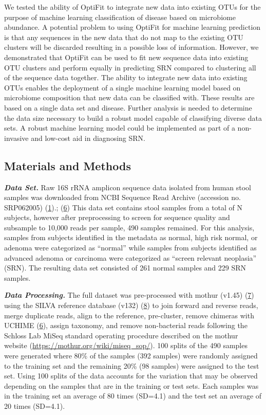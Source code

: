\documentclass[
]{article}
\begin{document}
We tested the ability of OptiFit to integrate new data into existing
OTUs for the purpose of machine learning classification of disease based
on microbiome abundance. A potential problem to using OptiFit for
machine learning prediction is that any sequences in the new data that
do not map to the existing OTU clusters will be discarded resulting in a
possible loss of information. However, we demonstrated that OptiFit can
be used to fit new sequence data into existing OTU clusters and perform
equally in predicting SRN compared to clustering all of the sequence
data together. The ability to integrate new data into existing OTUs
enables the deployment of a single machine learning model based on
microbiome composition that new data can be classified with. These
results are based on a single data set and disease. Further analysis is
needed to determine the data size necessary to build a robust model
capable of classifying diverse data sets. A robust machine learning
model could be implemented as part of a non-invasive and low-cost aid in
diagnosing SRN.

\hypertarget{materials-and-methods}{%
\subsection{Materials and Methods}\label{materials-and-methods}}

\textbf{\emph{Data Set.}} Raw 16S rRNA amplicon sequence data isolated
from human stool samples was downloaded from NCBI Sequence Read Archive
(accession no. SRP062005) (\protect\hyperlink{ref-baxter2016}{1}).;
(\protect\hyperlink{ref-edgar2011}{6}) This data set contains stool
samples from a total of N subjects, however after preprocessing to
screen for sequence quality and subsample to 10,000 reads per sample,
490 samples remained. For this analysis, samples from subjects
identified in the metadata as normal, high risk normal, or adenoma were
categorized as ``normal'' while samples from subjects identified as
advanced adenoma or carcinoma were categorized as ``screen relevant
neoplasia'' (SRN). The resulting data set consisted of 261 normal
samples and 229 SRN samples.

\textbf{\emph{Data Processing.}} The full dataset was pre-processed with
mothur (v1.45) (\protect\hyperlink{ref-schloss2009}{7}) using the SILVA
reference database (v132) (\protect\hyperlink{ref-quast2013}{8}) to join
forward and reverse reads, merge duplicate reads, align to the
reference, pre-cluster, remove chimeras with UCHIME
(\protect\hyperlink{ref-edgar2011}{6}), assign taxonomy, and remove
non-bacterial reads following the Schloss Lab MiSeq standard operating
procedure described on the mothur website
(\url{https://mothur.org/wiki/miseq_sop/}). 100 splits of the 490
samples were generated where 80\% of the samples (392 samples) were
randomly assigned to the training set and the remaining 20\% (98
samples) were assigned to the test set. Using 100 splits of the data
accounts for the variation that may be observed depending on the samples
that are in the training or test sets. Each samples was in the training
set an average of 80 times (SD=4.1) and the test set an average of 20
times (SD=4.1).
\end{document}
